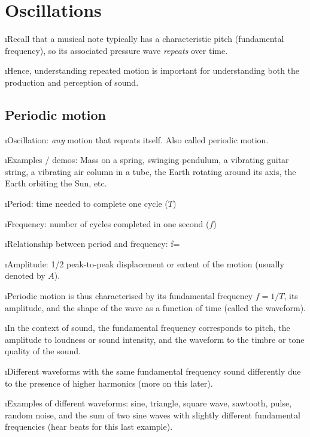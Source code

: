 \section{Oscillations}

\bi

\i Recall that a musical note typically has a characteristic 
pitch (fundamental frequency), so its associated pressure wave 
{\em repeats} over time.

\i Hence, understanding repeated motion 
is important for understanding both the production and 
perception of sound.

\ei

\subsection{Periodic motion}

\bi

\i Oscillation: {\em any} motion that repeats itself.
Also called periodic motion.

\i Examples / demos: Mass on a spring, swinging pendulum,
a vibrating guitar string, a vibrating air column in a tube,
the Earth rotating around its axis, the Earth orbiting the Sun,
etc.

\i Period: time needed to complete one cycle ($T$)

\i Frequency: number of cycles completed in one second ($f$)

\i Relationship between period and frequency:
%
\be
f=
\ee
%

\i Amplitude: 1/2 peak-to-peak displacement or extent of the motion
(usually denoted by $A$).

\i Periodic motion is thus characterised by its fundamental frequency
$f=1/T$, its amplitude, and the shape of the wave as a function of
time (called the waveform).

\i In the context of sound, the fundamental frequency corresponds to
pitch, the amplitude to loudness or sound intensity, and the waveform 
to the timbre or tone quality of the sound.

\i Different waveforms with the same fundamental frequency sound 
differently due to the presence of higher harmonics (more on this
later).

\i Examples of different waveforms:
sine, triangle, square wave, sawtooth, pulse, random noise, and
the sum of two sine waves with slightly different fundamental 
frequencies (hear beats for this last example).

